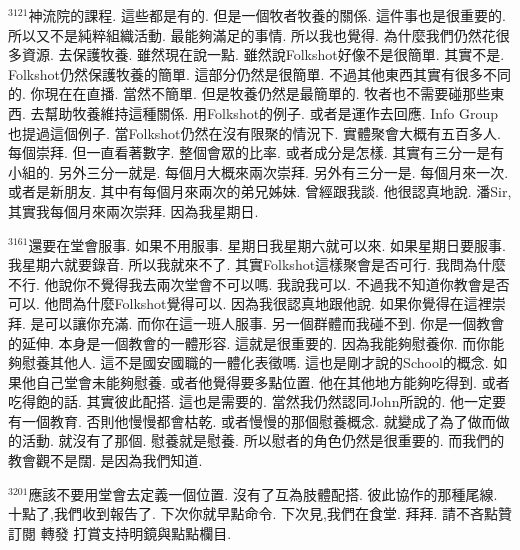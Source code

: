 \documentclass{book}
\begin{document}
$^{3121}$神流院的課程.
這些都是有的.
但是一個牧者牧養的關係.
這件事也是很重要的.
所以又不是純粹組織活動.
最能夠滿足的事情.
所以我也覺得.
為什麼我們仍然花很多資源.
去保護牧養.
雖然現在說一點.
雖然說Folkshot好像不是很簡單.
其實不是.
Folkshot仍然保護牧養的簡單.
這部分仍然是很簡單.
不過其他東西其實有很多不同的.
你現在在直播.
當然不簡單.
但是牧養仍然是最簡單的.
牧者也不需要碰那些東西.
去幫助牧養維持這種關係.
用Folkshot的例子.
或者是運作去回應.
Info Group也提過這個例子.
當Folkshot仍然在沒有限聚的情況下.
實體聚會大概有五百多人.
每個崇拜.
但一直看著數字.
整個會眾的比率.
或者成分是怎樣.
其實有三分一是有小組的.
另外三分一就是.
每個月大概來兩次崇拜.
另外有三分一是.
每個月來一次.
或者是新朋友.
其中有每個月來兩次的弟兄姊妹.
曾經跟我談.
他很認真地說.
潘Sir,其實我每個月來兩次崇拜.
因為我星期日.

$^{3161}$還要在堂會服事.
如果不用服事.
星期日我星期六就可以來.
如果星期日要服事.
我星期六就要錄音.
所以我就來不了.
其實Folkshot這樣聚會是否可行.
我問為什麼不行.
他說你不覺得我去兩次堂會不可以嗎.
我說我可以.
不過我不知道你教會是否可以.
他問為什麼Folkshot覺得可以.
因為我很認真地跟他說.
如果你覺得在這裡崇拜.
是可以讓你充滿.
而你在這一班人服事.
另一個群體而我碰不到.
你是一個教會的延伸.
本身是一個教會的一體形容.
這就是很重要的.
因為我能夠慰養你.
而你能夠慰養其他人.
這不是國安國職的一體化表徵嗎.
這也是剛才說的School的概念.
如果他自己堂會未能夠慰養.
或者他覺得要多點位置.
他在其他地方能夠吃得到.
或者吃得飽的話.
其實彼此配搭.
這也是需要的.
當然我仍然認同John所說的.
他一定要有一個教育.
否則他慢慢都會枯乾.
或者慢慢的那個慰養概念.
就變成了為了做而做的活動.
就沒有了那個.
慰養就是慰養.
所以慰者的角色仍然是很重要的.
而我們的教會觀不是闊.
是因為我們知道.

$^{3201}$應該不要用堂會去定義一個位置.
沒有了互為肢體配搭.
彼此協作的那種尾線.
十點了,我們收到報告了.
下次你就早點命令.
下次見,我們在食堂.
拜拜.
請不吝點贊 訂閱 轉發 打賞支持明鏡與點點欄目.
\newpage
\end{document}
